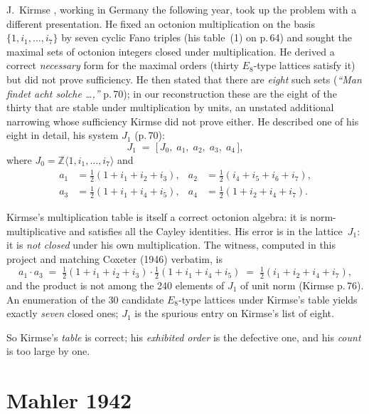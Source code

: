\documentclass[11pt]{amsart}
\newcommand{\ZZ}{\mathbb{Z}}
\begin{document}
J.~Kirmse \cite{Kirmse1924}, working in Germany the following year, took up
the problem with a different presentation.  He fixed an octonion
multiplication on the basis $\{1, i_1, \ldots, i_7\}$ by seven cyclic Fano
triples (his table~(1) on p.\,64) and sought the maximal sets of octonion
integers closed under multiplication.  He derived a correct
\emph{necessary} form for the maximal orders (thirty $E_8$-type
lattices satisfy it) but did not prove sufficiency.  He then stated
that there are \emph{eight} such sets
(\emph{``Man findet acht solche \ldots,''} p.\,70); in our
reconstruction these are the eight of the thirty that are stable
under multiplication by units, an unstated additional narrowing
whose sufficiency Kirmse did not prove either.  He described one of
his eight in detail, his system $J_1$ (p.\,70):
\[
  J_1 \;=\; \big[\, J_0,\; a_1,\; a_2,\; a_3,\; a_4\,\big],
\]
where $J_0 = \ZZ\langle 1, i_1, \ldots, i_7\rangle$ and
\begin{align*}
  a_1 &= \tfrac{1}{2}(1 + i_1 + i_2 + i_3), &
  a_2 &= \tfrac{1}{2}(i_4 + i_5 + i_6 + i_7), \\
  a_3 &= \tfrac{1}{2}(1 + i_1 + i_4 + i_5), &
  a_4 &= \tfrac{1}{2}(1 + i_2 + i_4 + i_7).
\end{align*}

Kirmse's multiplication table is itself a correct octonion algebra: it is
norm-multiplicative and satisfies all the Cayley identities.  His error is
in the lattice~$J_1$: it is \emph{not closed} under his own multiplication.
The witness, computed in this project and matching Coxeter (1946) verbatim,
is
\[
  a_1 \cdot a_3
  \;=\; \tfrac{1}{2}(1 + i_1 + i_2 + i_3) \cdot
        \tfrac{1}{2}(1 + i_1 + i_4 + i_5)
  \;=\; \tfrac{1}{2}(i_1 + i_2 + i_4 + i_7),
\]
and the product is not among the 240 elements of $J_1$ of unit norm
(Kirmse p.\,76).  An enumeration of the $30$ candidate $E_8$-type lattices
under Kirmse's table yields exactly \emph{seven} closed ones; $J_1$ is the
spurious entry on Kirmse's list of eight.

So Kirmse's \emph{table} is correct; his \emph{exhibited order} is the
defective one, and his \emph{count} is too large by one.

\section*{Mahler 1942}
\end{document}
